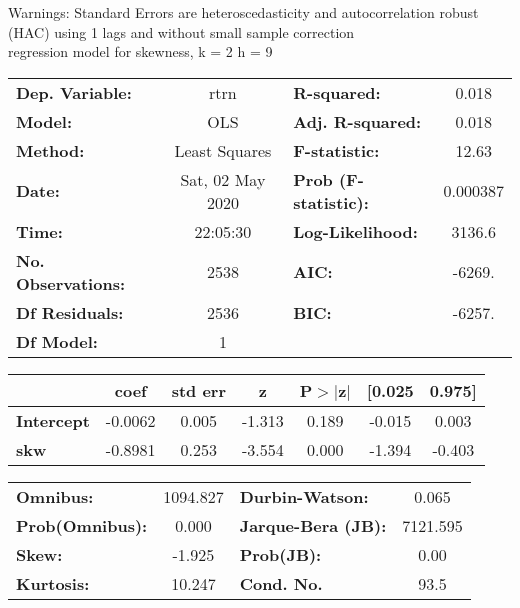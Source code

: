Warnings: \newline
 [1] Standard Errors are heteroscedasticity and autocorrelation robust (HAC) using 1 lags and without small sample correction\\ 

regression model for skewness, k = 2 h = 9\begin{center}
\begin{tabular}{lclc}
\toprule
\textbf{Dep. Variable:}    &       rtrn       & \textbf{  R-squared:         } &     0.018   \\
\textbf{Model:}            &       OLS        & \textbf{  Adj. R-squared:    } &     0.018   \\
\textbf{Method:}           &  Least Squares   & \textbf{  F-statistic:       } &     12.63   \\
\textbf{Date:}             & Sat, 02 May 2020 & \textbf{  Prob (F-statistic):} &  0.000387   \\
\textbf{Time:}             &     22:05:30     & \textbf{  Log-Likelihood:    } &    3136.6   \\
\textbf{No. Observations:} &        2538      & \textbf{  AIC:               } &    -6269.   \\
\textbf{Df Residuals:}     &        2536      & \textbf{  BIC:               } &    -6257.   \\
\textbf{Df Model:}         &           1      & \textbf{                     } &             \\
\bottomrule
\end{tabular}
\begin{tabular}{lcccccc}
                   & \textbf{coef} & \textbf{std err} & \textbf{z} & \textbf{P$> |$z$|$} & \textbf{[0.025} & \textbf{0.975]}  \\
\midrule
\textbf{Intercept} &      -0.0062  &        0.005     &    -1.313  &         0.189        &       -0.015    &        0.003     \\
\textbf{skw}       &      -0.8981  &        0.253     &    -3.554  &         0.000        &       -1.394    &       -0.403     \\
\bottomrule
\end{tabular}
\begin{tabular}{lclc}
\textbf{Omnibus:}       & 1094.827 & \textbf{  Durbin-Watson:     } &    0.065  \\
\textbf{Prob(Omnibus):} &   0.000  & \textbf{  Jarque-Bera (JB):  } & 7121.595  \\
\textbf{Skew:}          &  -1.925  & \textbf{  Prob(JB):          } &     0.00  \\
\textbf{Kurtosis:}      &  10.247  & \textbf{  Cond. No.          } &     93.5  \\
\bottomrule
\end{tabular}
\end{center}

